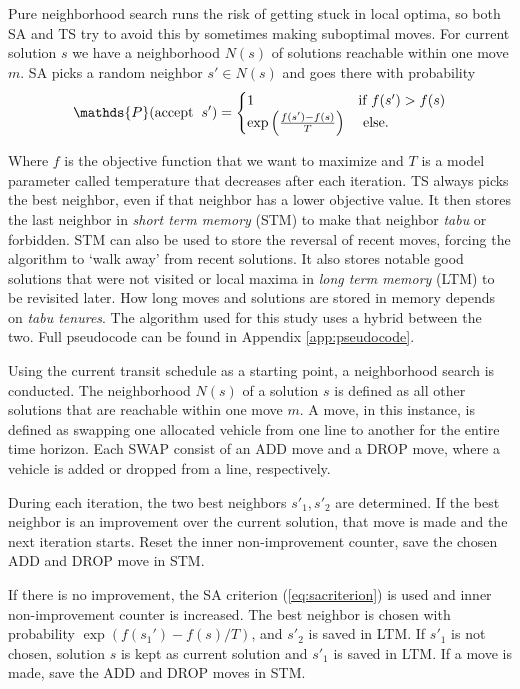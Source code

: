 Pure neighborhood search runs the risk of getting stuck in local optima, so both SA and TS try to avoid this by sometimes making suboptimal moves. For current solution $s$ we have a neighborhood $N(s)$ of solutions reachable within one move $m$. SA picks a random neighbor $s'\in N(s)$ and goes there with probability
\begin{equation}\label{eq:sacriterion}
    \mathds{P}(\text{accept}\hs s') =
    \begin{cases}
        1                                       & \text{if } f(s') > f(s) \\
        \exp\left(\frac{f(s') - f(s)}{T}\right) & \text{ else.}
    \end{cases}
\end{equation}

Where $f$ is the objective function that we want to maximize and $T$ is a model parameter called temperature that decreases after each iteration. TS always picks the best neighbor, even if that neighbor has a lower objective value. It then stores the last neighbor in \emph{short term memory} (STM) to make that neighbor \emph{tabu} or forbidden. STM can also be used to store the reversal of recent moves, forcing the algorithm to `walk away' from recent solutions. It also stores notable good solutions that were not visited or local maxima in \emph{long term memory} (LTM) to be revisited later. How long moves and solutions are stored in memory depends on \emph{tabu tenures}. The algorithm used for this study uses a hybrid between the two. Full pseudocode can be found in Appendix \ref{app:pseudocode}.

Using the current transit schedule as a starting point, a neighborhood search is conducted. The neighborhood $N(s)$ of a solution $s$ is defined as all other solutions that are reachable within one move $m$. A move, in this instance, is defined as swapping one allocated vehicle from one line to another for the entire time horizon. Each SWAP consist of an ADD move and a DROP move, where a vehicle is added or dropped from a line, respectively.

During each iteration, the two best neighbors $s'_1, s'_2$ are determined. If the best neighbor is an improvement over the current solution, that move is made and the next iteration starts. Reset the inner non-improvement counter, save the chosen ADD and DROP move in STM.

If there is no improvement, the SA criterion (\ref{eq:sacriterion}) is used and inner non-improvement counter is increased. The best neighbor is chosen with probability $\exp(f(s_1') - f(s)/T)$, and $s'_2$ is saved in LTM. If $s'_1$ is not chosen, solution $s$ is kept as current solution and $s'_1$ is saved in LTM. If a move is made, save the ADD and DROP moves in STM.

